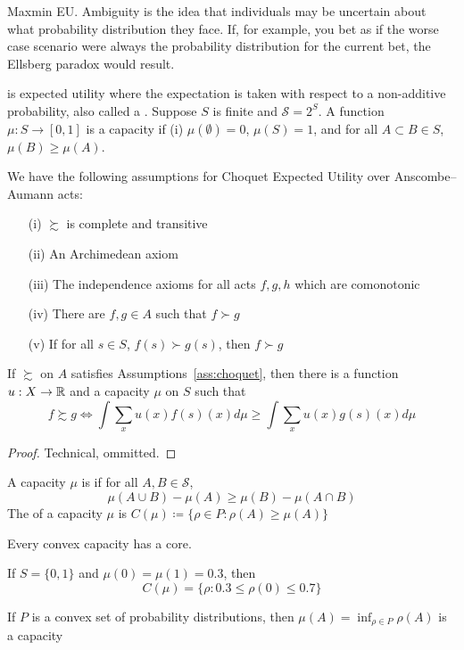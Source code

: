 \documentclass[12pt]{article}
\begin{document}
\begin{example}
	Maxmin EU. Ambiguity is the idea that individuals may be uncertain about what probability distribution they face. If, for example, you bet as if the worse case scenario were always the probability distribution for the current bet, the Ellsberg paradox would result.
\end{example}

\begin{definition}
	 is expected utility where the expectation is taken with respect to a non-additive probability, also called a . Suppose $S$ is finite and $\mathcal{S} = 2^S$. A function $\mu: S \to [0,1]$ is a capacity if (i) $\mu(\emptyset) = 0$, $\mu(S) = 1$, and for all $A \subset B \in S$, $\mu(B) \ge \mu(A)$. 
\end{definition}

\begin{assumption}\label{ass:choquet}
	We have the following assumptions for Choquet Expected Utility over Anscombe--Aumann acts:
	\begin{itemize}
		\item[(i)] $\succsim$ is complete and transitive
		\item[(ii)] An Archimedean axiom
		\item[(iii)] The independence axioms for all acts $f,g,h$ which are comonotonic
		\item[(iv)] There are $f,g \in A$ such that $f \succ g$
		\item[(v)] If for all $s \in S$, $f(s) \succ g(s)$, then $f \succ g$
	\end{itemize}
\end{assumption}

\begin{theorem}
	If $\succsim$ on $A$ satisfies Assumptions~\ref{ass:choquet}, then there is a function $u: X \to \mathbb{R}$ and a capacity $\mu$ on $S$ such that
	\[
	f \succsim g \Longleftrightarrow \int \sum_x u(x)f(s)(x)d\mu \ge \int \sum_x u(x)g(s)(x)d\mu
	\]
\end{theorem}
\begin{proof}
	Technical, ommitted.
\end{proof}

\begin{definition}
	A capacity $\mu$ is  if for all $A,B \in \mathcal{S}$,
	\[
	\mu(A \cup B) - \mu(A) \ge \mu(B) - \mu(A \cap B)
	\]
	The  of a capacity $\mu$ is $C(\mu) \coloneqq \{\rho \in P : \rho(A) \ge \mu(A)\}$
\end{definition}
\begin{lemma}
	Every convex capacity has a core.
\end{lemma}
\begin{example}
	If $S = \{0,1\}$ and $\mu(0) = \mu(1) = 0.3$, then
	\[
	C(\mu) = \{\rho : 0.3 \le \rho(0) \le 0.7\}
	\]
\end{example}
\begin{remark}
	If $P$ is a convex set of probability distributions, then $\mu(A) = \inf_{\rho \in P}\rho(A)$ is a capacity
\end{remark}
\end{document}
